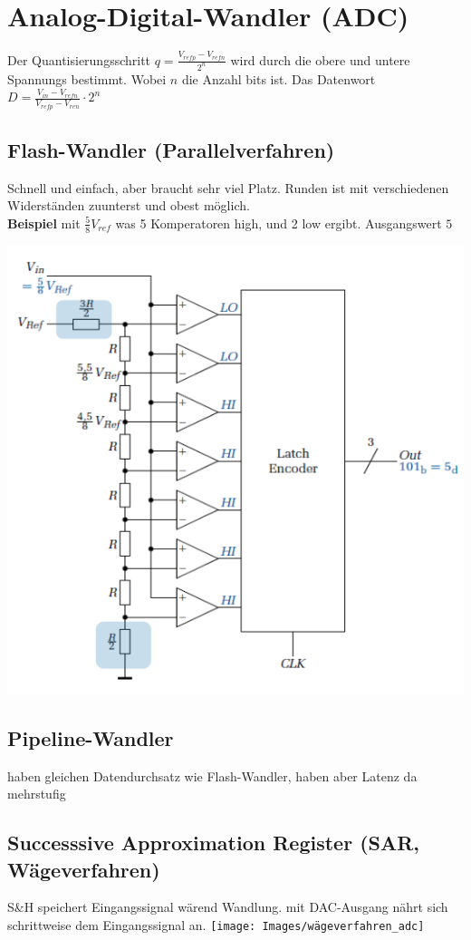 \section{Analog-Digital-Wandler (ADC)}
Der Quantisierungsschritt $q = \frac{V_{refp} - V_{refn}}{2^n}$ wird durch die obere und untere Spannungs bestimmt. Wobei $n$ die Anzahl bits ist. Das Datenwort $D = \frac{V_{in} - V_{refn}}{V_{refp} - V_{ren}}\cdot 2^n$
\subsection{Flash-Wandler (Parallelverfahren)}
Schnell und einfach, aber braucht sehr viel Platz. Runden ist mit verschiedenen Widerständen zuunterst und obest möglich.\\

\textbf{Beispiel} mit $\frac{5}{8}V_{ref}$ was 5 Komperatoren high, und 2 low ergibt. Ausgangswert $5$
\begin{center}
	\includegraphics[width=0.6\columnwidth]{Images/adc_parallel}
\end{center}


\subsection{Pipeline-Wandler}
haben gleichen Datendurchsatz wie Flash-Wandler, haben aber Latenz da mehrstufig

\subsection{Successsive Approximation Register (SAR, Wägeverfahren)}
S\&H speichert Eingangssignal wärend Wandlung. mit DAC-Ausgang nährt sich schrittweise dem Eingangssignal an.
\texttt{[image: Images/wägeverfahren\_adc]}


